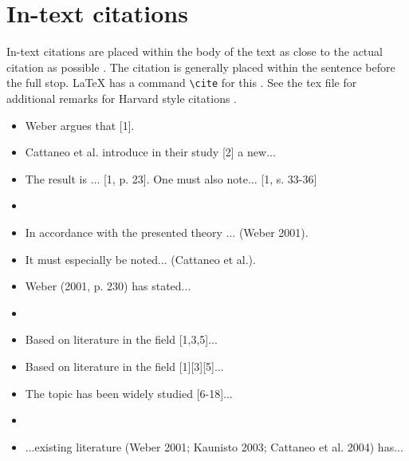 \documentclass[12pt,a4paper,finnish]{tutthesis}
\begin{document}
\section{In-text citations}

In-text citations are placed within the body of the text as close to
the actual citation as possible \parencite{rubberwheel}. The citation is generally placed
within the sentence before the full stop. LaTeX has a command
\texttt{\textbackslash cite} for this \parencite[p. 85]{oetiker14}. See the
tex file for additional remarks for Harvard style citations \parencites {wang2010143}{alrefaie2010842}
\parencite{alrefaie2010842}.
%
%



\begin{itemize}
  \setlength{\itemsep}{-10pt} %
  \small
\item[] Weber argues that [1]. 
\item[] Cattaneo et al. introduce in their study [2] a new...
\item[] The result is ... [1, p. 23]. One must also note... [1, s. 33-36]
\item[]
\item[] In accordance with the presented theory ... (Weber 2001).
\item[] It must especially be noted... (Cattaneo et al.).
\item[] Weber (2001, p. 230) has stated...
\item[]
\item[] Based on literature in the field [1,3,5]...
\item[] Based on literature in the field [1][3][5]...
\item[] The topic has been widely studied [6-18]...
\item[]
\item[] ...existing literature (Weber 2001; Kaunisto 2003; Cattaneo et al. 2004) has...
\end{itemize}
\end{document}
